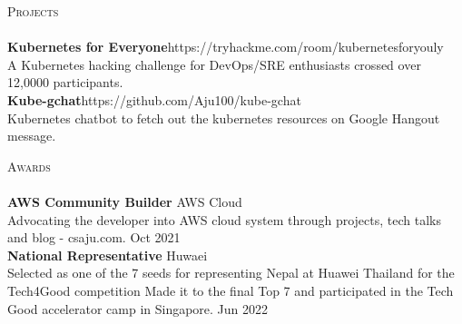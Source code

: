 \documentclass[a4paper]{article}
\newcommand{\lineunder} {
    \vspace*{-8pt} \\
    \hspace*{-18pt} \hrulefill \\
}
\newcommand{\header} [1] {
    {\hspace*{-18pt}\vspace*{6pt} \textsc{#1}}
    \vspace*{-6pt} \lineunder
}
\begin{document}
\header{Projects}
{\textbf{Kubernetes for Everyone}}\hfill https://tryhackme.com/room/kubernetesforyouly\\
A Kubernetes hacking challenge for DevOps/SRE enthusiasts crossed over 12,0000 participants.\\
\vspace*{2mm}
{\textbf{Kube-gchat}}\hfill https://github.com/Aju100/kube-gchat\\
Kubernetes chatbot to fetch out the kubernetes resources on Google Hangout message.\\
\vspace*{2mm}

\header{Awards}
\textbf{AWS Community Builder} \hfill AWS Cloud\\
Advocating the developer into AWS cloud system through projects, tech talks and blog - csaju.com. \hfill Oct 2021\\
\vspace*{2mm}
\textbf{National Representative} \hfill Huwaei\\
Selected as one of the 7 seeds for representing Nepal at Huawei Thailand for the Tech4Good competition Made it to the final Top 7 and participated in the Tech Good accelerator camp in Singapore. \hfill Jun 2022\\
\vspace*{2mm}

\ 
\end{document}
